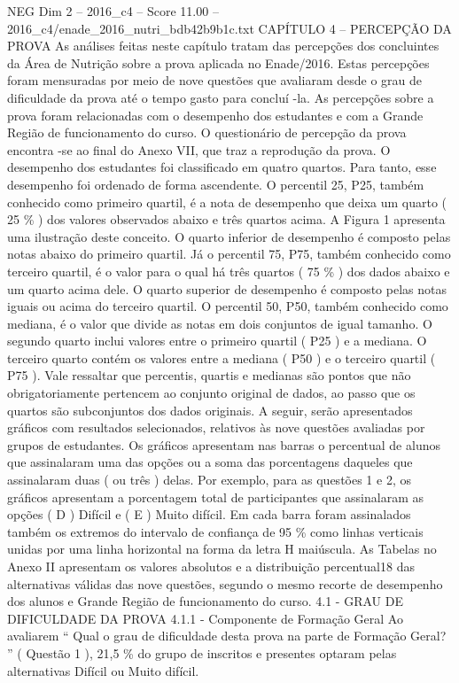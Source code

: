 \begin{textsample}{NEG Dim 2 – 2016\_c4 – Score 11.00 – 2016\_c4/enade\_2016\_nutri\_bdb42b9b1c.txt}  \label{ex:f2_neg_359}
CAPÍTULO 4 – PERCEPÇÃO DA PROVA As análises feitas neste capítulo tratam das percepções dos concluintes da Área de Nutrição sobre a prova aplicada no Enade/2016.
Estas percepções foram mensuradas por meio de nove questões que avaliaram desde o grau de dificuldade da prova até o tempo gasto para concluí -la.
As percepções sobre a prova foram relacionadas com o desempenho dos estudantes e com a Grande Região de funcionamento do curso.
O questionário de percepção da prova encontra -se ao final do Anexo VII, que traz a reprodução da prova.
O desempenho dos estudantes foi classificado em quatro quartos.
Para tanto, esse desempenho foi ordenado de forma ascendente.
O percentil 25, P25, também conhecido como primeiro quartil, é a nota de desempenho que deixa um quarto ( 25 \% ) dos valores observados abaixo e três quartos acima.
A Figura 1 apresenta uma ilustração deste conceito.
O quarto inferior de desempenho é composto pelas notas abaixo do primeiro quartil.
Já o percentil 75, P75, também conhecido como terceiro quartil, é o valor para o qual há três quartos ( 75 \% ) dos dados abaixo e um quarto acima dele.
O quarto superior de desempenho é composto pelas notas iguais ou acima do terceiro quartil.
O percentil 50, P50, também conhecido como mediana, é o valor que divide as notas em dois conjuntos de igual tamanho.
O segundo quarto inclui valores entre o primeiro quartil ( P25 ) e a mediana.
O terceiro quarto contém os valores entre a mediana ( P50 ) e o terceiro quartil ( P75 ).
Vale ressaltar que percentis, quartis e medianas são pontos que não obrigatoriamente pertencem ao conjunto original de dados, ao passo que os quartos são subconjuntos dos dados originais.
A seguir, serão apresentados gráficos com resultados selecionados, relativos às nove questões avaliadas por grupos de estudantes.
Os gráficos apresentam nas barras o percentual de alunos que assinalaram uma das opções ou a soma das porcentagens daqueles que assinalaram duas ( ou três ) delas.
Por exemplo, para as questões 1 e 2, os gráficos apresentam a porcentagem total de participantes que assinalaram as opções ( D ) Difícil e ( E ) Muito difícil.
Em cada barra foram assinalados também os extremos do intervalo de confiança de 95 \% como linhas verticais unidas por uma linha horizontal na forma da letra H maiúscula.
As Tabelas no Anexo II apresentam os valores absolutos e a distribuição percentual18 das alternativas válidas das nove questões, segundo o mesmo recorte de desempenho dos alunos e Grande Região de funcionamento do curso. 4.1 - GRAU DE DIFICULDADE DA PROVA 4.1.1 - Componente de Formação Geral Ao avaliarem “ Qual o grau de dificuldade desta prova na parte de Formação Geral? ” ( Questão 1 ), 21,5 \% do grupo de inscritos e presentes optaram pelas alternativas Difícil ou Muito difícil.

\end{textsample}
